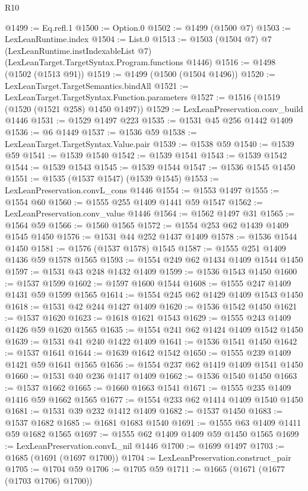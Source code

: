 \begin{lexlean}{R10}
\begin{coremodule}
@1499 := Eq.refl.{1}
@1500 := Option.{0}
@1502 := @1499 (@1500 @7)
@1503 := LexLeanRuntime.index
@1504 := List.{0}
@1513 := @1503
    (@1504 @7)
    @7
    (LexLeanRuntime.instIndexableList @7)
    (LexLeanTarget.TargetSyntax.Program.functions @1446)
@1516 := @1498 (@1502 (@1513 @91))
@1519 := @1499 (@1500 (@1504 @1496))
@1520 := LexLeanTarget.TargetSemantics.bindAll
@1521 := LexLeanTarget.TargetSyntax.Function.parameters
@1527 := @1516 (@1519 (@1520 (@1521 @258) @1450 @1497))
@1529 := LexLeanPreservation.conv_build @1446
@1531 := @1529 @1497 @223
@1535 := @1531 @45 @256 @1442 @1409
@1536 := @6 @1449
@1537 := @1536 @59
@1538 := LexLeanTarget.TargetSyntax.Value.pair
@1539 := @1538 @59
@1540 := @1539 @59
@1541 := @1539 @1540
@1542 := @1539 @1541
@1543 := @1539 @1542
@1544 := @1539 @1543
@1545 := @1539 @1544
@1547 := @1536 @1545 @1450
@1551 := @1535 (@1537 @1547) (@1539 @1545)
@1553 := LexLeanPreservation.convL_cons @1446
@1554 := @1553 @1497
@1555 := @1554 @60
@1560 := @1555 @255 @1409 @1441 @59 @1547
@1562 := LexLeanPreservation.conv_value @1446
@1564 := @1562 @1497 @31
@1565 := @1564 @59
@1566 := @1560 @1565
@1572 := @1554 @253 @62 @1439 @1409 @1545 @1450
@1576 := @1531 @44 @252 @1437 @1409
@1578 := @1536 @1544 @1450
@1581 := @1576 (@1537 @1578) @1545
@1587 := @1555 @251 @1409 @1436 @59 @1578 @1565
@1593 := @1554 @249 @62 @1434 @1409 @1544 @1450
@1597 := @1531 @43 @248 @1432 @1409
@1599 := @1536 @1543 @1450
@1600 := @1537 @1599
@1602 := @1597 @1600 @1544
@1608 := @1555 @247 @1409 @1431 @59 @1599 @1565
@1614 := @1554 @245 @62 @1429 @1409 @1543 @1450
@1618 := @1531 @42 @244 @1427 @1409
@1620 := @1536 @1542 @1450
@1621 := @1537 @1620
@1623 := @1618 @1621 @1543
@1629 := @1555 @243 @1409 @1426 @59 @1620 @1565
@1635 := @1554 @241 @62 @1424 @1409 @1542 @1450
@1639 := @1531 @41 @240 @1422 @1409
@1641 := @1536 @1541 @1450
@1642 := @1537 @1641
@1644 := @1639 @1642 @1542
@1650 := @1555 @239 @1409 @1421 @59 @1641 @1565
@1656 := @1554 @237 @62 @1419 @1409 @1541 @1450
@1660 := @1531 @40 @236 @1417 @1409
@1662 := @1536 @1540 @1450
@1663 := @1537 @1662
@1665 := @1660 @1663 @1541
@1671 := @1555 @235 @1409 @1416 @59 @1662 @1565
@1677 := @1554 @233 @62 @1414 @1409 @1540 @1450
@1681 := @1531 @39 @232 @1412 @1409
@1682 := @1537 @1450
@1683 := @1537 @1682
@1685 := @1681 @1683 @1540
@1691 := @1555 @63 @1409 @1411 @59 @1682 @1565
@1697 := @1555 @62 @1409 @1409 @59 @1450 @1565
@1699 := LexLeanPreservation.convL_nil @1446
@1700 := @1699 @1497
@1703 := @1685 (@1691 (@1697 @1700))
@1704 := LexLeanPreservation.construct_pair
@1705 := @1704 @59
@1706 := @1705 @59
@1711 := @1665 (@1671 (@1677 (@1703 @1706) @1700))

\end{coremodule}
\end{lexlean}
